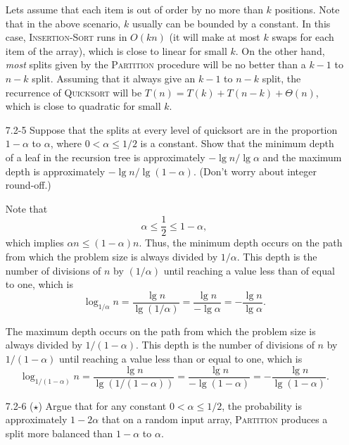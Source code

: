 \documentclass{report}
\makeatletter
\renewenvironment{framed}{%
 \def\FrameCommand##1{\hskip\@totalleftmargin
 \fboxsep=\FrameSep\fbox{##1}}%
 \MakeFramed {\advance\hsize-\width
   \@totalleftmargin\z@ \linewidth\hsize
   \@setminipage}}%
 {\par\unskip\endMakeFramed}
\makeatother
\begin{document}
\begin{enumerate}
\begin{framed}
Lets assume that each item is out of order by no more than $k$ positions. Note
that in the above scenario, $k$ usually can be bounded by a constant. In this
case, \textsc{Insertion-Sort} runs in $O(kn)$ (it will make at most $k$ swaps
for each item of the array), which is close to linear for small $k$. On the
other hand, \emph{most} splits given by the \textsc{Partition} procedure will
be no better than a $k - 1$ to $n - k$ split. Assuming that it always give an
$k - 1$ to $n - k$ split, the recurrence of \textsc{Quicksort} will be
$T(n) = T(k) + T(n - k) + \Theta(n)$, which is close to quadratic for small $k$.
\end{framed}

\item[7.2{-}5]{Suppose that the splits at every level of quicksort are in the
proportion $1 - \alpha$ to $\alpha$, where $0 < \alpha \le 1/2$ is a constant.
Show that the minimum depth of a leaf in the recursion tree is approximately
$- \lg n / \lg \alpha$ and the maximum depth is approximately
$- \lg n / \lg (1 - \alpha)$. (Don't worry about integer round-off.)}

\begin{framed}
Note that
\[
  \alpha \le \frac{1}{2} \le 1 - \alpha,
\]
which implies $\alpha n \le (1 - \alpha) n$. Thus, the minimum depth occurs on
the path from which the problem size is always divided by $1/\alpha$. This depth
is the number of divisions of $n$ by
$(1/\alpha)$ until reaching a value less than of equal to one, which is
\[
  \log_{1/\alpha} n = \frac{\lg n}{\lg (1/\alpha)}
                    = \frac{\lg n}{- \lg \alpha}
                    = - \frac{\lg n}{\lg \alpha}.
\]

The maximum depth occurs on the path from which the problem size is always
divided by $1/(1 - \alpha)$. This depth is the number of divisions of $n$ by
$1/(1 - \alpha)$ until reaching a value less than or equal to one, which is
\[
  \log_{1/(1 - \alpha)} n
  = \frac{\lg n}{\lg (1/(1 - \alpha))}
  = \frac{\lg n}{- \lg (1 - \alpha)} = - \frac{\lg n}{\lg (1 - \alpha)}.
\]

\end{framed}

\newpage

\item[7.2{-}6]{($\star$) Argue that for any constant $0 < \alpha \le 1/2$, the
probability is approximately $1 - 2\alpha$ that on a random input array,
\textsc{Partition} produces a split more balanced than $1 - \alpha$ to $\alpha$.}


\end{enumerate}
\end{document}
